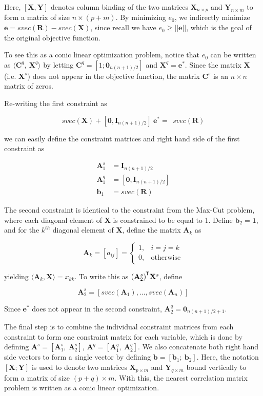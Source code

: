 \documentclass{article}
\newcommand{\ve}[1]{\mathbf{#1}}           %
\newcommand{\m}[1]{\mathbf{#1}}               %
\newcommand{\tr}[1]{{#1}^{\mkern-1.5mu\mathsf{T}}}              %
\begin{document}
Here, $[\m{X},\m{Y}]$ denotes column binding of the two matrices $\m{X}_{n\times p}$ and $\m{Y}_{n \times m}$ to form a matrix of size $n \times (p+m)$. By minimizing $e_{0}$, we indirectly minimize $\ve{e} = svec(\m{R}) - svec(\m{X})$, since recall we have $e_{0} \geq ||\ve{e}||$, which is the goal of the original objective function.

To see this as a conic linear optimization problem, notice that $e_{0}$ can be written as $\langle \m{C}^{q},~\m{X}^{q} \rangle$ by letting $\m{C}^{q} = [1;\ve{0}_{n(n+1)/2}]$ and $\m{X}^{q} = \ve{e}^{\ast}$. Since the matrix $\m{X}$ (i.e. $\m{X}^{s}$) does not appear in the objective function, the matrix $\m{C}^{s}$ is an $n \times n$ matrix of zeros.

Re-writing the first constraint as

\[
svec(\m{X}) + [\ve{0}, \m{I}_{n(n+1)/2}]~\ve{e}^{\ast} =~~  svec(\m{R})
\]

\noindent we can easily define the constraint matrices and right hand side of the first constraint as

\[
\begin{array}{rl}
\m{A}_{1}^{s} &= \m{I}_{n(n+1)/2} \\
\m{A}_{1}^{q} &= [\ve{0}, \m{I}_{n(n+1)/2}] \\
\ve{b}_{1} &= svec(\m{R})
\end{array}
\]

The second constraint is identical to the constraint from the Max-Cut problem, where each diagonal element of $\m{X}$ is constrained to be equal to 1. Define $\ve{b}_{2} = \ve{1}$, and for the $k^{th}$ diagonal element of $\m{X}$, define the matrix $\m{A}_{k}$ as

\[
\m{A}_{k} = [a_{ij}] = 
\begin{cases}
1, & i = j = k \\
0, & \text{otherwise}
\end{cases}
\]

\noindent yielding $\langle \m{A}_{k},\m{X} \rangle = x_{kk}$. To write this as $\tr{(\m{A}_{2}^{s})}\m{X}^{s}$, define 

\[
\m{A}_{2}^{s} = [svec(\m{A}_{1}),...,svec(\m{A}_{n})]
\]

Since $\ve{e}^{\ast}$ does not appear in the second constraint, $\m{A}_{2}^{q} = \ve{0}_{n(n+1)/2+1}$. 

The final step is to combine the individual constraint matrices from each constraint to form one constraint matrix for each variable, which is done by defining $\m{A}^{s} = [\m{A}_{1}^{s},~\m{A}_{2}^{s}]$, $\m{A}^{q} = [\m{A}_{1}^{q},~\m{A}_{2}^{q}]$. We also concatenate both right hand side vectors to form a single vector by defining $\ve{b} = [\ve{b}_{1};~\ve{b}_{2}]$. Here, the notation $[\m{X};\m{Y}]$ is used to denote two matrices $\m{X}_{p \times m}$ and $\m{Y}_{q \times m}$ bound vertically to form a matrix of size $(p+q) \times m$. With this, the nearest correlation matrix problem is written as a conic linear optimization.
\end{document}
